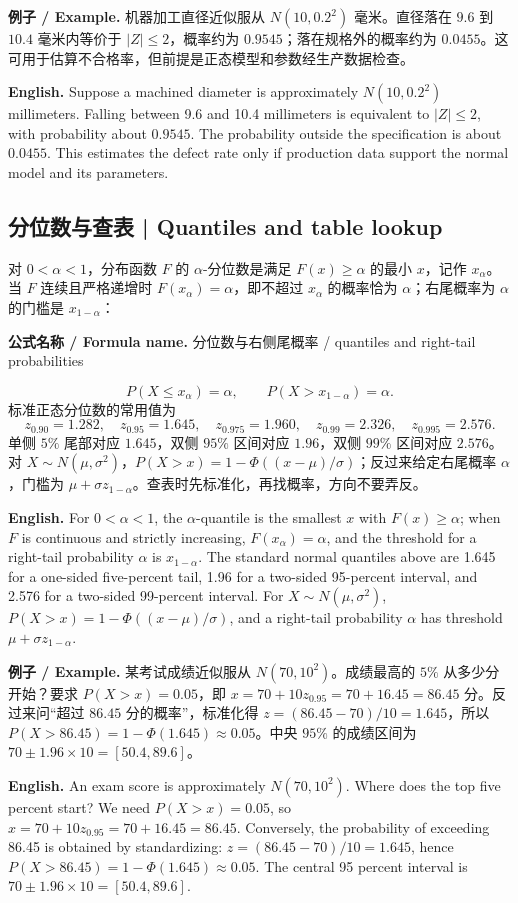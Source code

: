 \documentclass[UTF8,11pt,a4paper]{ctexart}
\newcommand{\EN}[1]{\par\noindent\textbf{English.} #1\par}
\newcommand{\FORMULA}[2]{\par\noindent\textbf{公式名称 / Formula name.} #1 / #2\par}
\newcommand{\EX}[2]{\par\noindent\textbf{例子 / Example.} #1\par\EN{#2}}
\begin{document}
\EX{机器加工直径近似服从 $N(10,0.2^2)$ 毫米。直径落在 $9.6$ 到 $10.4$ 毫米内等价于 $|Z|\le2$，概率约为 $0.9545$；落在规格外的概率约为 $0.0455$。这可用于估算不合格率，但前提是正态模型和参数经生产数据检查。}{Suppose a machined diameter is approximately $N(10,0.2^2)$ millimeters. Falling between 9.6 and 10.4 millimeters is equivalent to $|Z|\le2$, with probability about $0.9545$. The probability outside the specification is about $0.0455$. This estimates the defect rate only if production data support the normal model and its parameters.}

\subsection{分位数与查表 | Quantiles and table lookup}
\noindent 对 $0<\alpha<1$，分布函数 $F$ 的 $\alpha$-分位数是满足 $F(x)\ge\alpha$ 的最小 $x$，记作 $x_\alpha$。当 $F$ 连续且严格递增时 $F(x_\alpha)=\alpha$，即不超过 $x_\alpha$ 的概率恰为 $\alpha$；右尾概率为 $\alpha$ 的门槛是 $x_{1-\alpha}$：
\FORMULA{分位数与右侧尾概率}{quantiles and right-tail probabilities}
\[
P(X\le x_\alpha)=\alpha,\qquad P(X>x_{1-\alpha})=\alpha.
\]
标准正态分位数的常用值为
\[
z_{0.90}=1.282,\quad z_{0.95}=1.645,\quad z_{0.975}=1.960,\quad z_{0.99}=2.326,\quad z_{0.995}=2.576.
\]
单侧 $5\%$ 尾部对应 $1.645$，双侧 $95\%$ 区间对应 $1.96$，双侧 $99\%$ 区间对应 $2.576$。对 $X\sim N(\mu,\sigma^2)$，$P(X>x)=1-\Phi((x-\mu)/\sigma)$；反过来给定右尾概率 $\alpha$，门槛为 $\mu+\sigma z_{1-\alpha}$。查表时先标准化，再找概率，方向不要弄反。
\EN{For $0<\alpha<1$, the $\alpha$-quantile is the smallest $x$ with $F(x)\ge\alpha$; when $F$ is continuous and strictly increasing, $F(x_\alpha)=\alpha$, and the threshold for a right-tail probability $\alpha$ is $x_{1-\alpha}$. The standard normal quantiles above are 1.645 for a one-sided five-percent tail, 1.96 for a two-sided 95-percent interval, and 2.576 for a two-sided 99-percent interval. For $X\sim N(\mu,\sigma^2)$, $P(X>x)=1-\Phi((x-\mu)/\sigma)$, and a right-tail probability $\alpha$ has threshold $\mu+\sigma z_{1-\alpha}$.}

\EX{某考试成绩近似服从 $N(70,10^2)$。成绩最高的 $5\%$ 从多少分开始？要求 $P(X>x)=0.05$，即 $x=70+10z_{0.95}=70+16.45=86.45$ 分。反过来问“超过 $86.45$ 分的概率”，标准化得 $z=(86.45-70)/10=1.645$，所以 $P(X>86.45)=1-\Phi(1.645)\approx0.05$。中央 $95\%$ 的成绩区间为 $70\pm1.96\times10=[50.4,89.6]$。}{An exam score is approximately $N(70,10^2)$. Where does the top five percent start? We need $P(X>x)=0.05$, so $x=70+10z_{0.95}=70+16.45=86.45$. Conversely, the probability of exceeding 86.45 is obtained by standardizing: $z=(86.45-70)/10=1.645$, hence $P(X>86.45)=1-\Phi(1.645)\approx0.05$. The central 95 percent interval is $70\pm1.96\times10=[50.4,89.6]$.}
\end{document}
